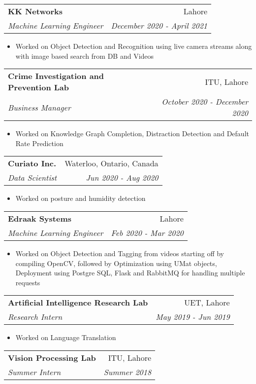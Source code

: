 \documentclass[letterpaper,11pt]{article}
\makeatletter
\newcommand{\resumeSubheading}[4]{
  \vspace{-1pt}\item
    \begin{tabular*}{0.97\textwidth}[t]{l@{\extracolsep{\fill}}r}
      \textbf{#1} & #2 \\
      \textit{\small#3} & \textit{\small #4} \\
    \end{tabular*}\vspace{-5pt}
}
\makeatother
\begin{document}
			\resumeSubheading
      			{KK Networks}{Lahore}
      			{Machine Learning Engineer}{December 2020 - April 2021}
      
        \begin{itemize}
  				\item Worked on Object Detection and Recognition using live camera streams along with image based search from DB and Videos
			\end{itemize}
      

			\resumeSubheading
      			{Crime Investigation and Prevention Lab}{ITU, Lahore}
      			{Business Manager}{October 2020 - December 2020}
      
        \begin{itemize}
  				\item Worked on Knowledge Graph Completion, Distraction Detection and Default Rate Prediction
			\end{itemize}
          

			\resumeSubheading
      			{Curiato Inc.}{Waterloo, Ontario, Canada}
      			{Data Scientist}{Jun 2020 - Aug 2020}
      			
      			\begin{itemize}
  				\item Worked on posture and humidity detection
			\end{itemize}
			
						\resumeSubheading
      			{Edraak Systems}{Lahore}
      			{Machine Learning Engineer}{Feb 2020 - Mar 2020}
      			
      			\begin{itemize}

					\item Worked on Object Detection and Tagging from videos starting off by compiling OpenCV, followed by Optimization using UMat objects, Deployment using Postgre SQL, Flask and RabbitMQ for handling multiple requests  				
  				
			\end{itemize}
			
			\resumeSubheading
      			{Artificial Intelligence Research Lab}{UET, Lahore}
      			{Research Intern}{May 2019 - Jun 2019}
      
        
          \begin{itemize}
  				\item Worked on Language Translation
			\end{itemize}


           \resumeSubheading
      			{Vision Processing Lab}{ITU, Lahore}
      			{Summer Intern}{Summer 2018}
      
\end{document}
